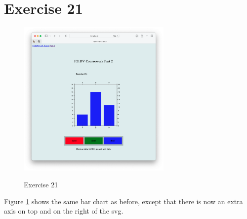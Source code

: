 \documentclass{scrreprt}
\begin{document}
\newpage
\section{Exercise 21}
\begin{figure}[!ht]
    \centering
    \includegraphics[width = 7.5cm]{images/ex21.png}
    \label{fig:ex21}
    \caption{Exercise 21}
\end{figure}
\FloatBarrier
% 
Figure \ref{fig:ex21} shows the same bar chart as before, except that there is now an extra axis on top and on the right of the svg.

\newpage
\end{document}
